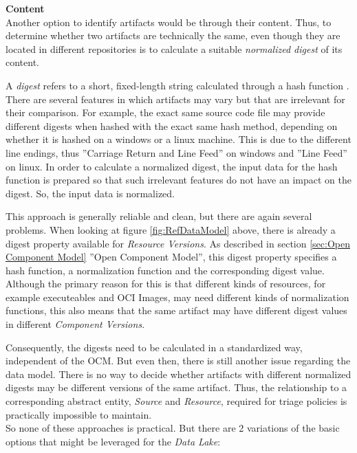 \noindent\textbf{Content}\\
Another option to identify artifacts would be through their content. Thus, to determine whether two artifacts are technically the same, even though they are located in different repositories is to calculate a suitable \emph{normalized digest} of its content.\par 
A \emph{digest} refers to a short, fixed-length string calculated through a hash function \cite{Cryptography}. There are several features in which artifacts may vary but that are irrelevant for their comparison. For example, the exact same source code file may provide different digests when hashed with the exact same hash method, depending on whether it is hashed on a windows or a linux machine. This is due to the different line endings, thus ''Carriage Return and Line Feed'' on windows and ''Line Feed'' on linux. In order to calculate a normalized digest, the input data for the hash function is prepared so that such irrelevant features do not have an impact on the digest. So, the input data is normalized.\par
This approach is generally reliable and clean, but there are again several problems. When looking at figure \ref{fig:RefDataModel} above, there is already a digest property available for \emph{Resource Versions}. As described in section \ref{sec:Open Component Model} ''Open Component Model'', this digest property specifies a hash function, a normalization function and the corresponding digest value. Although the primary reason for this is that different kinds of resources, for example executeables and OCI Images, may need different kinds of normalization functions, this also means that the same artifact may have different digest values in different \emph{Component Versions}.\par
Consequently, the digests need to be calculated in a standardized way, independent of the OCM. But even then, there is still another issue regarding the data model. There is no way to decide whether artifacts with different normalized digests may be different versions of the same artifact. Thus, the relationship to a corresponding abstract entity, \emph{Source} and \emph{Resource}, required for triage policies is practically impossible to maintain.\\

So none of these approaches is practical. But there are 2 variations of the basic options that might be leveraged for the \emph{Data Lake}:\\

